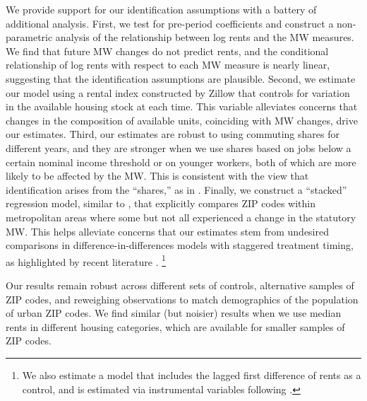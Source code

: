 We provide support for our identification assumptions with a battery of 
additional analysis.
First, we test for pre-period coefficients and construct a non-parametric 
analysis of the relationship between log rents and the MW measures.
We find that future MW changes do not predict rents, and the conditional
relationship of log rents with respect to each MW measure is nearly linear,
suggesting that the identification assumptions are plausible.
Second, we estimate our model using a rental index constructed by Zillow that 
controls for variation in the available housing stock at each time.
This variable alleviates concerns that changes in the composition of available 
units, coinciding with MW changes, drive our estimates.
Third, our estimates are robust to using commuting shares for different
years, and they are stronger when we use shares based on jobs below a 
certain nominal income threshold or on younger workers, both of which are 
more likely to be affected by the MW.
This is consistent with the view that identification arises from the ``shares,''
as in \textcite{GoldsmithpinkhamEtAl2020}.
Finally, we construct a ``stacked'' regression model, similar to 
\textcite{CegnizEtAl2019}, that explicitly compares ZIP codes within 
metropolitan areas where some but not all experienced a change in the 
statutory MW.
This helps alleviate concerns that our estimates stem from undesired 
comparisons in difference-in-differences models with staggered treatment 
timing, as highlighted by recent literature 
\parencite{deChaisemartinEtAl2022,RothEtAl2022}.%
\footnote{We also estimate a model that includes the lagged first difference 
	of rents as a control, and is estimated via instrumental variables following 
    \textcite{ArellanoBond1991}.}

Our results remain robust across different sets of controls,
alternative samples of ZIP codes, and reweighing observations to match 
demographics of the population of urban ZIP codes.
We find similar (but noisier) results when we use median rents in 
different housing categories, which are available for smaller samples of 
ZIP codes.


